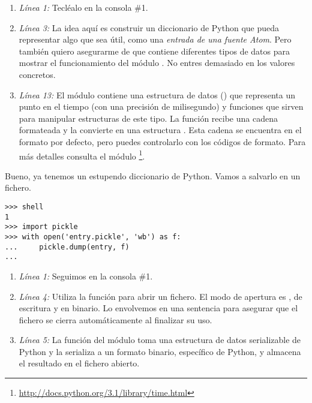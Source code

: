 \begin{enumerate}

\item \emph{Línea 1:} Tecléalo en la consola \#1.

\item \emph{Línea 3:} La idea aquí es construir un diccionario de Python que pueda representar algo que sea útil, como una \emph{entrada de una fuente Atom}. Pero también quiero asegurarme de que contiene diferentes tipos de datos para mostrar el funcionamiento del módulo . No entres demasiado en los valores concretos.

\item \emph{Línea 13:} El módulo  contiene una estructura de datos () que representa un punto en el tiempo (con una precisión de milisegundo) y funciones que sirven para manipular estructuras de este tipo. La función  recibe una cadena formateada y la convierte en una estructura . Esta cadena se encuentra en el formato por defecto, pero puedes controlarlo con los códigos de formato. Para más detalles consulta el módulo \footnote{\href{http://docs.python.org/3.1/library/time.html}{http://docs.python.org/3.1/library/time.html}}.

\end{enumerate}

Bueno, ya tenemos un estupendo diccionario de Python. Vamos a salvarlo en un fichero.

\noindent\begin{minipage}{\textwidth}
\begin{lstlisting}[mathescape=True]
>>> shell
1
>>> import pickle
>>> with open('entry.pickle', 'wb') as f:
...     pickle.dump(entry, f)
... 
\end{lstlisting}
\end{minipage}

\begin{enumerate}

\item \emph{Línea 1:} Seguimos en la consola \#1.

\item \emph{Línea 4:} Utiliza la función  para abrir un fichero. El modo de apertura es , de escritura y en binario. Lo envolvemos en una sentencia  para asegurar que el fichero se cierra automáticamente al finalizar su uso.

\item \emph{Línea 5:} La función  del módulo  toma una estructura de datos serializable de Python y la serializa a un formato binario, específico de Python, y almacena el resultado en el fichero abierto.

\end{enumerate}

